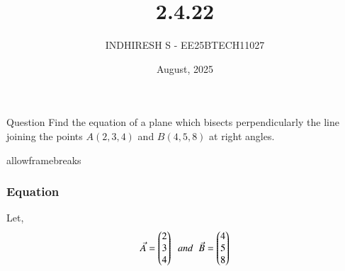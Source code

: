 \documentclass{beamer}
\title %
{2.4.22}
\date{August, 2025}
\author %
{INDHIRESH S - EE25BTECH11027}
\begin{document}
\frame{\titlepage}
\begin{frame}{Question}
 Find the equation of a plane which bisects perpendicularly the line joining the points $A(2, 3, 4)$ and $B(4, 5, 8)$ at right angles.\\
\end{frame}
\begin{frame}{allowframebreaks}
\frametitle{Equation}

    \centering
    
    \label{tab:parameters}
  Let,
\begin{align}
    \Vec{A}=\begin{pmatrix}2\\3\\4\end{pmatrix}\;\;and\;\;\Vec{B}=\begin{pmatrix}4\\5\\8\end{pmatrix}
\end{align}
   
\end{frame}
\end{document}
